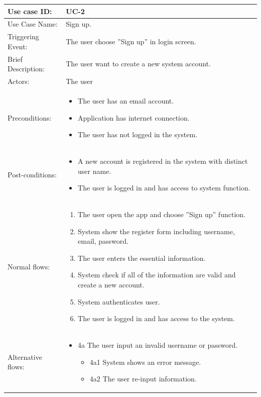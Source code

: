 \begin{table}[]
\begin{tabular}{| m{4cm} | m{11cm} |}
\hline
Use case ID:       & UC-2 \\ \hline
Use Case Name:     & Sign up. \\ \hline
Triggering Event:  & The user choose ''Sign up'' in login screen. \\ \hline
Brief Description: & The user want to create a new system account. \\ \hline
Actors:            & The user \\ \hline
Preconditions:     & \begin{itemize}
    \item The user has an email account.
    \item Application has internet connection.
    \item The user has not logged in the system.
\end{itemize} \\ \hline
Post-conditions:   & \begin{itemize}
    \item A new account is registered in the system with distinct user name.
    \item The user is logged in and has access to system function.
\end{itemize} \\ \hline
Normal flows:      & \begin{enumerate}
    \item The user open the app and choose ''Sign up'' function.
    \item System show the register form including username, email, password.
    \item The user enters the essential information.
    \item System check if all of the information are valid and create a new account.
    \item System authenticates user.
    \item The user is logged in and has access to the system.
\end{enumerate} \\ \hline
Alternative flows: & \begin{itemize}
    \item {4a The user input an invalid username or password.}
    \begin{itemize}
        \item 4a1 System shows an error message.
        \item 4a2 The user re-input information.

\end{itemize}
\end{itemize}
\end{tabular}
\end{table}
